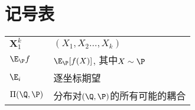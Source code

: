 \section*{记号表}

\begin{tabular}{p{} p{}}
\hline
	$\bm X_1^k$ & $(X_1, X_2 \dots, X_k)$ \\
	$\E_{\P} f$ & $\E_{\P} [f(X)]$, 其中$X \sim \P$ \\
	$\E_i$ & 逐坐标期望 \\
	$\Pi(\Q, \P)$ & 分布对$(\Q, \P)$的所有可能的耦合
\end{tabular}
